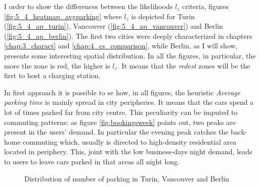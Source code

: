 I order to show the differences between the likelihoods $l_z$ criteria, figures \ref{fig:5_4_heatmap_avgparking} where $l_z$ is depicted for Turin (\ref{fig:5_4_ap_turin}), Vancouver (\ref{fig:5_4_ap_vancouver}) and Berlin (\ref{fig:5_4_ap_berlin}). The first two cities were deeply characterized in chapters \ref{chap:3_charact} and \ref{chap:4_cs_comparison}, while Berlin, as I will show, presents some interesting spatial distribution. In all the figures, in particular, the more the zone is red, the higher is $l_z$. It means that the \emph{redest} zones will be the first to host a charging station.

In first approach it is possible to se how, in all figures, the heuristic \textit{Average parking time} is mainly spread in city peripheries. It means that the cars spend a lot of times parked far from city centre. This peculiarity can be imputed to commuting patterns: as figure \ref{fig:bookingsweek} points out, two peaks are present in the users' demand. In particular the evening peak catches the back-home commuting which, usually is directed to high-density residential area located in periphery. This, joint with the low business-days night demand, leads to users to leave cars parked in that areas all night long.


\begin{figure}[th]
	\centering     %
	\quad
	\quad
	\caption{Distribution of number of parking in Turin, Vancouver and Berlin}
	\label{fig:5_4_heatmap_numparking}
\end{figure}

